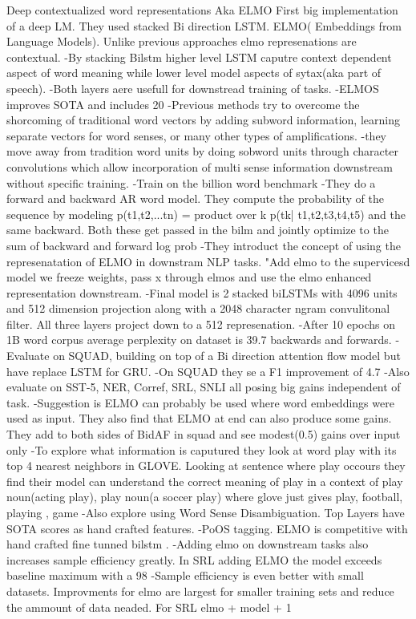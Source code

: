 Deep contextualized word representations Aka ELMO
First big implementation of a deep LM. 
They used stacked Bi direction LSTM. 
ELMO( Embeddings from Language Models). Unlike previous approaches  elmo represenations are contextual. 
-By stacking Bilstm higher level LSTM caputre context dependent aspect of word meaning while lower level model aspects of sytax(aka part of speech). 
-Both layers aere usefull for downstread training of tasks. 
-ELMOS improves SOTA and includes 20%
-Previous methods try to overcome the shorcoming of traditional word vectors by adding subword information, learning separate vectors for word senses, or many other types of amplifications.
-they move away from tradition word units by doing sobword units through character convolutions which allow incorporation of multi sense information downstream without specific training.
-Train on the billion word benchmark
-They do a forward and backward AR word model. They compute the probability of the sequence by modeling p(t1,t2,...tn) = product over k p(tk| t1,t2,t3,t4,t5) and the same backward. Both these get passed in the bilm and jointly optimize to the sum of backward and forward log prob
-They introduct the concept of using the represenatation of ELMO in downstram NLP tasks. "Add elmo to the supervicesd model we freeze weights, pass x  through elmos and use the elmo enhanced representation downstream.
-Final model is 2 stacked biLSTMs with 4096 units and 512 dimension projection along with a 2048 character ngram convulitonal filter. All three layers project down to a 512 represenation.
-After 10 epochs on 1B word corpus average perplexity on dataset is 39.7 backwards and forwards.  
-Evaluate on SQUAD, building on top of a Bi direction attention flow model \cite{ Seo et al 17}  but have replace LSTM for GRU. 
-On SQUAD they se a F1 improvement of 4.7%
-Also evaluate on SST-5, NER, Corref, SRL, SNLI all posing big gains independent of task.
-Suggestion is ELMO can probably be used  where word embeddings were used as input. They also find that ELMO at end can also produce some gains. They add to both sides of BidAF in squad and see modest(0.5) gains over input only
-To explore what information is caputured they look at word play with its top 4 nearest neighbors in GLOVE. Looking at sentence where play occours they find their model can understand the correct meaning of play in a context of play noun(acting play), play noun(a soccer play) where glove just gives play, football, playing , game
-Also explore using Word Sense Disambiguation. Top Layers have SOTA scores as hand crafted features.
-PoOS tagging. ELMO is competitive with hand crafted fine tunned bilstm .
-Adding elmo on downstream tasks also increases sample efficiency greatly. In SRL adding ELMO the model exceeds baseline maximum with a 98%
-Sample efficiency is even better with small datasets. Improvments for elmo are largest for smaller training sets and reduce the ammount of data neaded. For SRL elmo + model + 1%

